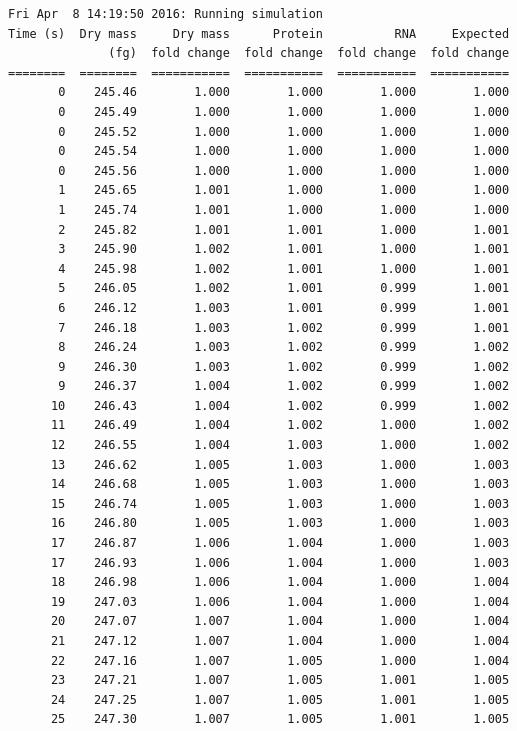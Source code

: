 \documentclass[12pt]{article}
\begin{document}
\begin{lstlisting}
Fri Apr  8 14:19:50 2016: Running simulation
Time (s)  Dry mass     Dry mass      Protein          RNA     Expected
              (fg)  fold change  fold change  fold change  fold change
========  ========  ===========  ===========  ===========  ===========
       0    245.46        1.000        1.000        1.000        1.000
       0    245.49        1.000        1.000        1.000        1.000
       0    245.52        1.000        1.000        1.000        1.000
       0    245.54        1.000        1.000        1.000        1.000
       0    245.56        1.000        1.000        1.000        1.000
       1    245.65        1.001        1.000        1.000        1.000
       1    245.74        1.001        1.000        1.000        1.000
       2    245.82        1.001        1.001        1.000        1.001
       3    245.90        1.002        1.001        1.000        1.001
       4    245.98        1.002        1.001        1.000        1.001
       5    246.05        1.002        1.001        0.999        1.001
       6    246.12        1.003        1.001        0.999        1.001
       7    246.18        1.003        1.002        0.999        1.001
       8    246.24        1.003        1.002        0.999        1.002
       9    246.30        1.003        1.002        0.999        1.002
       9    246.37        1.004        1.002        0.999        1.002
      10    246.43        1.004        1.002        0.999        1.002
      11    246.49        1.004        1.002        1.000        1.002
      12    246.55        1.004        1.003        1.000        1.002
      13    246.62        1.005        1.003        1.000        1.003
      14    246.68        1.005        1.003        1.000        1.003
      15    246.74        1.005        1.003        1.000        1.003
      16    246.80        1.005        1.003        1.000        1.003
      17    246.87        1.006        1.004        1.000        1.003
      17    246.93        1.006        1.004        1.000        1.003
      18    246.98        1.006        1.004        1.000        1.004
      19    247.03        1.006        1.004        1.000        1.004
      20    247.07        1.007        1.004        1.000        1.004
      21    247.12        1.007        1.004        1.000        1.004
      22    247.16        1.007        1.005        1.000        1.004
      23    247.21        1.007        1.005        1.001        1.005
      24    247.25        1.007        1.005        1.001        1.005
      25    247.30        1.007        1.005        1.001        1.005

\end{lstlisting}
\end{document}
